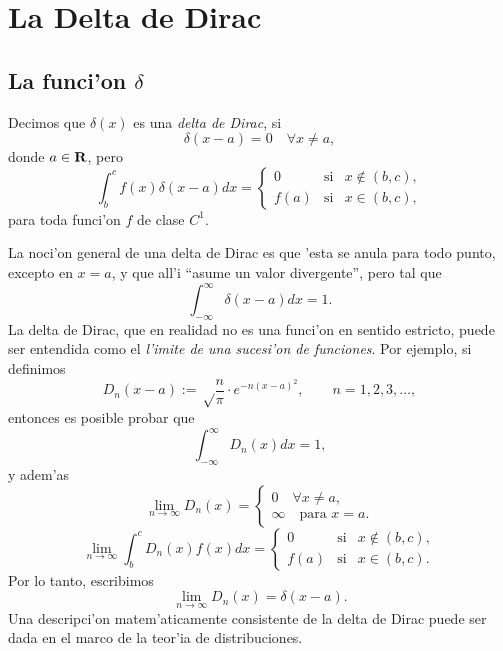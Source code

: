 \chapter{La Delta de Dirac}\label{app:Dirac}
\section{La funci'on $\delta$}
Decimos que $\delta(x)$ es una \textit{delta de Dirac}, si
\begin{equation}
\delta (x-a) = 0\quad \forall x\not = a,
\end{equation}
donde $a\in {\bf R}$, pero
\begin{equation}
\int_b^cf(x)\delta(x-a) d x = \left\{\begin{array}{ccl}
 0 & \text{si} & x\notin (b,c) ,\\
f(a)& \text{si} & x\in (b,c) ,
\end{array}\right.
\end{equation}
para toda funci'on $f$ de clase $C^1$.

 La noci'on general de una delta de Dirac es que 'esta se anula para todo punto,
excepto en $x=a$, y que all'i ``asume un valor divergente'', pero tal que
\begin{equation}
  \int_{-\infty}^{\infty}\delta(x-a)d x = 1.
 \end{equation}
 La delta de Dirac, que en realidad no es una funci'on en sentido estricto,
puede ser entendida como el \textit{l'imite de una sucesi'on de funciones}.
Por ejemplo, si definimos
\begin{equation}
  D_n(x-a) := \sqrt\frac n\pi\cdot e^{-n(x-a)^2}, \qquad n=1,2,3,\dots,
\end{equation}
entonces es posible probar que
\begin{equation}
\int_{-\infty}^{\infty}D_n(x) d x =  1,
\end{equation}
y adem'as
\begin{equation}
\lim_{n\to\infty} D_n(x) =  \left\{\begin{array}{l}0 \quad \forall x\neq
a,\\\infty \quad \text{para }      x=a.\end{array}\right.
\end{equation}
\begin{equation}
\lim_{n\to\infty}\int_b^cD_n(x)f(x)d x = \left\{\begin{array}{ccl}
 0 & \text{si} & x\notin (b,c) ,\\
f(a)& \text{si} & x\in (b,c) .
\end{array}\right.
\end{equation}
Por lo tanto, escribimos
\begin{equation}
  \lim_{n\to\infty}D_n(x)=\delta(x-a).
 \end{equation}
 Una descripci'on matem'aticamente consistente de la delta de Dirac puede ser
dada en el marco de la teor'ia de distribuciones.

